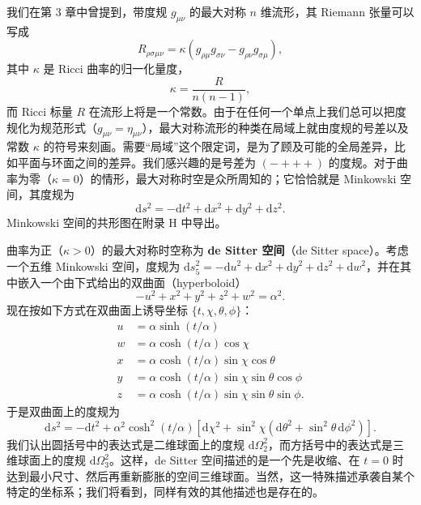 我们在第 3 章中曾提到，带度规 $g_{\mu\nu}$ 的最大对称 $n$ 维流形，其 Riemann 张量可以写成
\begin{equation*}
R_{\rho\sigma\mu\nu} = \kappa\left(g_{\rho\mu}g_{\sigma\nu} - g_{\rho\nu}g_{\sigma\mu}\right),
\tag{8.1}
\end{equation*}
其中 $\kappa$ 是 Ricci 曲率的归一化量度，
\begin{equation*}
\kappa = \frac{R}{n(n-1)},
\tag{8.2}
\end{equation*}
而 Ricci 标量 $R$ 在流形上将是一个常数。由于在任何一个单点上我们总可以把度规化为规范形式（$g_{\mu\nu}=\eta_{\mu\nu}$），最大对称流形的种类在局域上就由度规的号差以及常数 $\kappa$ 的符号来刻画。需要“局域”这个限定词，是为了顾及可能的全局差异，比如平面与环面之间的差异。我们感兴趣的是号差为 $(-+++)$ 的度规。对于曲率为零（$\kappa=0$）的情形，最大对称时空是众所周知的；它恰恰就是 Minkowski 空间，其度规为
\begin{equation*}
\mathrm{d}s^2 = -\mathrm{d}t^2 + \mathrm{d}x^2 + \mathrm{d}y^2 + \mathrm{d}z^2.
\tag{8.3}
\end{equation*}
Minkowski 空间的共形图在附录 H 中导出。

曲率为正（$\kappa>0$）的最大对称时空称为 \textbf{de Sitter 空间}（de Sitter space）。考虑一个五维 Minkowski 空间，度规为 $\mathrm{d}s_5^2 = -\mathrm{d}u^2 + \mathrm{d}x^2 + \mathrm{d}y^2 + \mathrm{d}z^2 + \mathrm{d}w^2$，并在其中嵌入一个由下式给出的双曲面（hyperboloid）
\begin{equation*}
-u^2 + x^2 + y^2 + z^2 + w^2 = \alpha^2.
\tag{8.4}
\end{equation*}
现在按如下方式在双曲面上诱导坐标 $\{t,\chi,\theta,\phi\}$：
\begin{equation*}
\begin{aligned}
u &= \alpha\sinh(t/\alpha)\\
w &= \alpha\cosh(t/\alpha)\cos\chi\\
x &= \alpha\cosh(t/\alpha)\sin\chi\cos\theta\\
y &= \alpha\cosh(t/\alpha)\sin\chi\sin\theta\cos\phi\\
z &= \alpha\cosh(t/\alpha)\sin\chi\sin\theta\sin\phi.
\end{aligned}
\tag{8.5}
\end{equation*}
于是双曲面上的度规为
\begin{equation*}
\mathrm{d}s^2 = -\mathrm{d}t^2 + \alpha^2\cosh^2(t/\alpha)\left[\mathrm{d}\chi^2 + \sin^2\chi\left(\mathrm{d}\theta^2 + \sin^2\theta\,\mathrm{d}\phi^2\right)\right].
\tag{8.6}
\end{equation*}
我们认出圆括号中的表达式是二维球面上的度规 $\mathrm{d}\Omega_2^2$，而方括号中的表达式是三维球面上的度规 $\mathrm{d}\Omega_3^2$。这样，de Sitter 空间描述的是一个先是收缩、在 $t=0$ 时达到最小尺寸、然后再重新膨胀的空间三维球面。当然，这一特殊描述承袭自某个特定的坐标系；我们将看到，同样有效的其他描述也是存在的。

